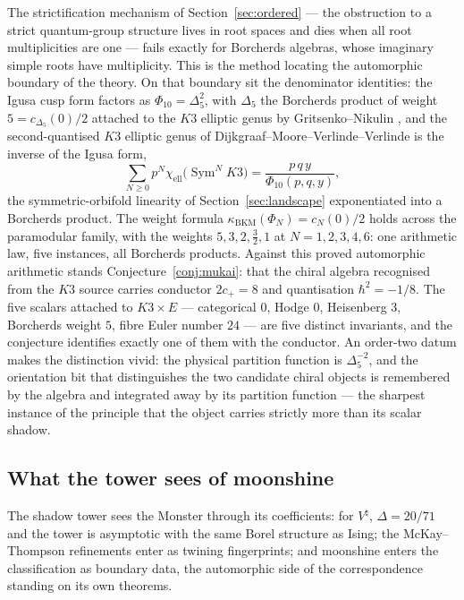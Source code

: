 \documentclass[11pt]{amsart}
\numberwithin{equation}{section}
\theoremstyle{plain}
\theoremstyle{definition}
\theoremstyle{remark}
\begin{document}
The strictification mechanism of Section~\ref{sec:ordered} --- the
obstruction to a strict quantum-group structure lives in root spaces
and dies when all root multiplicities are one --- fails exactly for
Borcherds algebras, whose imaginary simple roots have multiplicity.
This is the method locating the automorphic boundary of the theory. On that boundary sit the
denominator identities: the Igusa cusp form factors as
$\Phi_{10}=\Delta_5^{2}$, with $\Delta_5$ the Borcherds product of
weight $5=c_{\Delta_5}(0)/2$ attached to the $K3$ elliptic genus by
Gritsenko--Nikulin \cite{GN}, and the second-quantised $K3$ elliptic
genus of Dijkgraaf--Moore--Verlinde--Verlinde \cite{DMVV} is the inverse of the
Igusa form,
\begin{equation}
\sum_{N\geq0}p^{N}\chi_{\mathrm{ell}}
\bigl(\operatorname{Sym}^{N}K3\bigr)
=\frac{p\,q\,y}{\Phi_{10}(p,q,y)},
\end{equation}
the symmetric-orbifold linearity of Section~\ref{sec:landscape}
exponentiated into a Borcherds product. The
weight formula $\kappa_{\mathrm{BKM}}(\Phi_N)=c_N(0)/2$ holds across
the paramodular family, with the weights $5,3,2,\tfrac32,1$ at
$N=1,2,3,4,6$: one arithmetic law, five instances, all Borcherds
products. Against this proved automorphic arithmetic
stands Conjecture~\ref{conj:mukai}: that the chiral algebra recognised
from the $K3$ source carries conductor $2c_+=8$ and quantisation
$\hbar^{2}=-1/8$. The five scalars attached to $K3\times E$ ---
categorical $0$, Hodge $0$, Heisenberg $3$, Borcherds weight $5$,
fibre Euler number $24$ --- are five distinct invariants, and the
conjecture identifies exactly one of them with the conductor. An order-two datum makes the
distinction vivid: the physical partition function is
$\Delta_5^{-2}$, and the orientation bit that distinguishes
the two candidate chiral objects is remembered by the algebra and
integrated away by its partition function --- the sharpest instance of
the principle that the object carries strictly more than its scalar
shadow.

\subsection{What the tower sees of moonshine}

The shadow tower sees the Monster through its coefficients: for
$V^{\natural}$, $\Delta=20/71$ and the tower is asymptotic with the
same Borel structure as Ising; the McKay--Thompson refinements enter
as twining fingerprints; and moonshine enters the classification as
boundary data, the automorphic side of the correspondence standing on
its own theorems.
\end{document}
